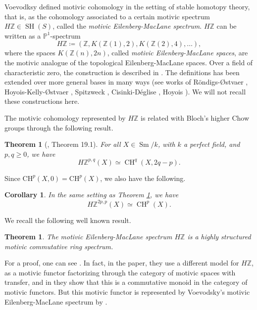 \documentclass[10pt]{amsart}
\theoremstyle{definition}
\theoremstyle{plain}
\newtheorem{thm}[defn]{Theorem}
\newtheorem{corollary}[defn]{Corollary}
\numberwithin{equation}{section}
\newcommand{\0}{\emptyset}
\renewcommand{\P}{{\mathbb P}}
\newcommand{\Z}{{\mathbb Z}}
\newcommand{\SH}{{\operatorname{SH}}}
\newcommand{\Sm}{{\operatorname{Sm}}}
\newcommand{\CH}{{\operatorname{CH}}}
\begin{document}
Voevodksy defined motivic cohomology in the setting of stable homotopy theory, that is, as the cohomology associated to a certain motivic spectrum $H\Z \in \SH(S)$, called the \emph{motivic Eilenberg-MacLane spectrum}. $H\Z$ can be written as a $\P^1$-spectrum
$$H\Z \coloneqq (\Z, K(\Z(1),2), K(\Z(2),4), \ldots),$$
where the spaces $K(\Z(n),2n)$, called \emph{motivic Eilenberg-MacLane spaces}, are the motivic analogue of the topological Eilenberg-MacLane spaces. Over a field of characteristic zero, the construction is described in \cite[Section 6.1]{voe:homotopy_theory}. The definitions has been extended over more general bases in many ways (see works of R\"{o}ndigs-{\O}stvaer \cite{rond:modules}, Hoyois-Kelly-{\O}stvaer \cite{Hoy:Steenrod}, Spitzweck \cite{Spitzweck:HZ}, Cisinki-Déglise \cite{deglise:mixmot}, Hoyois \cite{Hoyois:localization}). We will not recall these constructions here. 

The motivic cohomology represented by $H\Z$ is related with Bloch's higher Chow groups through the following result.

\begin{thm}[\cite{MazWei:lectures}, Theorem 19.1]
\label{thm:chow-motiviccohomology}
    For all $X \in \Sm/k$, with $k$ a perfect field, and $p,q \ge 0$, we have 
    $$H\Z^{p,q}(X) \simeq \CH^q(X, 2q-p).$$
\end{thm}

Since $\text{CH}^p(X,0)=\text{CH}^p(X)$, we also have the following.

\begin{corollary}
\label{cor:HZ,CH}
    In the same setting as Theorem \ref{thm:chow-motiviccohomology}, we have
    $$H\Z^{2p,p}(X) \simeq \CH^p(X).$$
\end{corollary}

We recall the following well known result.

\begin{thm}
    The motivic Eilenberg-MacLane spectrum $H\Z$ is a highly structured motivic commutative ring spectrum.
\end{thm}

For a proof, one can see \cite{DunRon:Functors}. In fact, in the paper, they use a different model for $H\Z$, as a motivic functor factorizing through the category of motivic spaces with transfer, and in \cite[Example 3.4]{DunRon:Functors} they show that this is a commutative monoid in the category of motivic functors. But this motivic functor is represented by Voevodsky's motivic Eilenberg-MacLane spectrum by \cite[Lemma 4.6]{DunRon:Functors}. 
\end{document}
